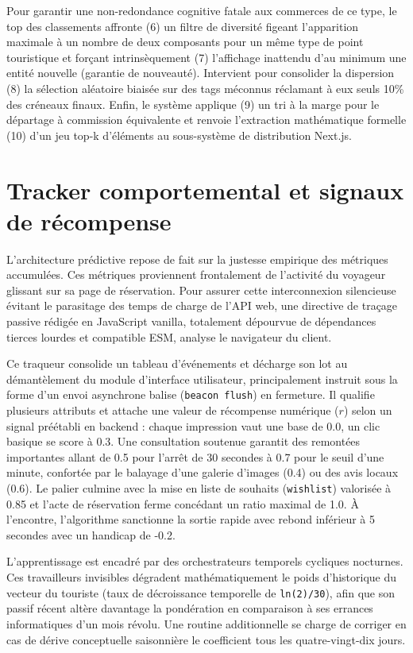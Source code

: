 Pour garantir une non-redondance cognitive fatale aux commerces de ce type, le top des classements affronte (6) un filtre de diversité figeant l'apparition maximale à un nombre de deux composants pour un même type de point touristique et forçant intrinsèquement (7) l'affichage inattendu d'au minimum une entité nouvelle (garantie de nouveauté). Intervient pour consolider la dispersion (8) la sélection aléatoire biaisée sur des tags méconnus réclamant à eux seuls 10\% des créneaux finaux. Enfin, le système applique (9) un tri à la marge pour le départage à commission équivalente et renvoie l'extraction mathématique formelle (10) d'un jeu top-k d'éléments au sous-système de distribution Next.js.

\section{Tracker comportemental et signaux de récompense}

L'architecture prédictive repose de fait sur la justesse empirique des métriques accumulées. Ces métriques proviennent frontalement de l'activité du voyageur glissant sur sa page de réservation. Pour assurer cette interconnexion silencieuse évitant le parasitage des temps de charge de l'API web, une directive de traçage passive rédigée en JavaScript vanilla, totalement dépourvue de dépendances tierces lourdes et compatible ESM, analyse le navigateur du client.

Ce traqueur consolide un tableau d'événements et décharge son lot au démantèlement du module d'interface utilisateur, principalement instruit sous la forme d'un envoi asynchrone balise (\texttt{beacon flush}) en fermeture. Il qualifie plusieurs attributs et attache une valeur de récompense numérique ($r$) selon un signal préétabli en backend : chaque impression vaut une base de 0.0, un clic basique se score à 0.3. Une consultation soutenue garantit des remontées importantes allant de 0.5 pour l'arrêt de 30 secondes à 0.7 pour le seuil d'une minute, confortée par le balayage d'une galerie d'images (0.4) ou des avis locaux (0.6). Le palier culmine avec la mise en liste de souhaits (\texttt{wishlist}) valorisée à 0.85 et l'acte de réservation ferme concédant un ratio maximal de 1.0. À l'encontre, l'algorithme sanctionne la sortie rapide avec rebond inférieur à 5 secondes avec un handicap de -0.2.

L'apprentissage est encadré par des orchestrateurs temporels cycliques nocturnes. Ces travailleurs invisibles dégradent mathématiquement le poids d'historique du vecteur du touriste (taux de décroissance temporelle de \texttt{ln(2)/30}), afin que son passif récent altère davantage la pondération en comparaison à ses errances informatiques d'un mois révolu. Une routine additionnelle se charge de corriger en cas de dérive conceptuelle saisonnière le coefficient tous les quatre-vingt-dix jours.

